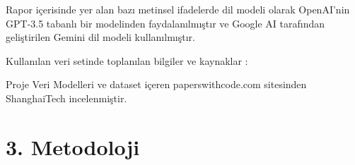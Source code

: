 \documentclass[10pt,a4paper]{report}
\begin{document}
	Rapor içerisinde yer alan bazı metinsel ifadelerde dil modeli olarak OpenAI'nin GPT-3.5 tabanlı bir modelinden faydalanılmıştır\cite{chatgpt_dilmodeli} ve  Google AI tarafından geliştirilen Gemini dil modeli kullanılmıştır\cite{gemini}.	\newline
	

   Kullanılan \cite{CrowdCounting_dataset1} veri setinde toplanılan bilgiler ve kaynaklar :\cite{change2013semi}\cite{chen2013cumulative}\cite{loy2013crowd}\cite{chen2012feature}\newline
	
   Proje Veri Modelleri ve dataset içeren paperswithcode.com sitesinden  ShanghaiTech\cite{ShanghaiTech} incelenmiştir.


\newpage
\raggedright\section*{3. Metodoloji}
\end{document}
